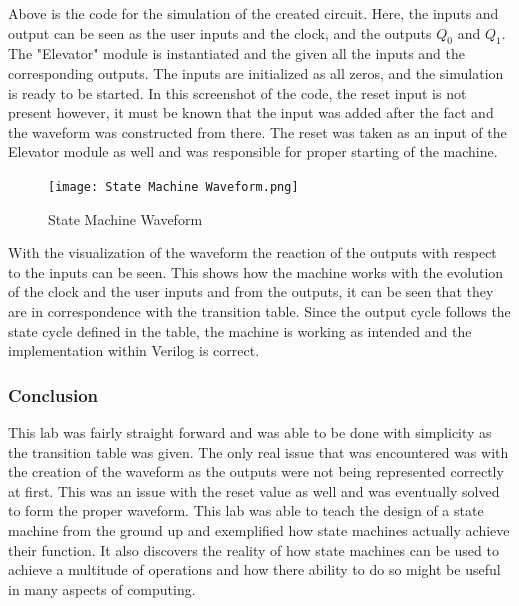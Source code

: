 \documentclass[12pt]{article}
\begin{document}
    \par Above is the code for the simulation of the created circuit. Here, the
    inputs and output can be seen as the user inputs and the clock, and the
    outputs $Q_0$ and $Q_1$. The "Elevator" module is instantiated and the given
    all the inputs and the corresponding outputs. The inputs are initialized as
    all zeros, and the simulation is ready to be started. In this screenshot of
    the code, the reset input is not present however, it must be known that the
    input was added after the fact and the waveform was constructed from there.
    The reset was taken as an input of the Elevator module as well and was
    responsible for proper starting of the machine.
    \begin{figure}[h]
        \centering
        \texttt{[image: State Machine Waveform.png]}
        \caption{State Machine Waveform}
    \end{figure}
    \par With the visualization of the waveform the reaction of the outputs with
    respect to the inputs can be seen. This shows how the machine works with the
    evolution of the clock and the user inputs and from the outputs, it can be
    seen that they are in correspondence with the transition table. Since the
    output cycle follows the state cycle defined in the table, the machine is
    working as intended and the implementation within Verilog is correct.
    \subsubsection*{Conclusion}
    \par This lab was fairly straight forward and was able to be done with
    simplicity as the transition table was given. The only real issue that was
    encountered was with the creation of the waveform as the outputs were not
    being represented correctly at first. This was an issue with the reset value
    as well and was eventually solved to form the proper waveform.  This lab was
    able to teach the design of a state machine from the ground up and
    exemplified how state machines actually achieve their function. It also
    discovers the reality of how state machines can be used to achieve a
    multitude of operations and how there ability to do so might be useful in
    many aspects of computing.
\end{document}
